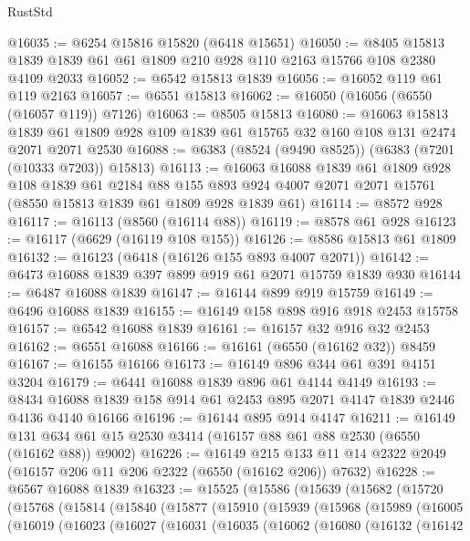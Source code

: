 \begin{lexlean}{RustStd}
\begin{coremodule}
@16035 := @6254 @15816 @15820 (@6418 @15651)
@16050 := @8405 @15813 @1839 @1839 @61 @61 @1809 @210 @928 @110 @2163 @15766 @108 @2380 @4109 @2033
@16052 := @6542 @15813 @1839
@16056 := @16052 @119 @61 @119 @2163
@16057 := @6551 @15813
@16062 := @16050 (@16056 (@6550 (@16057 @119)) @7126)
@16063 := @8505 @15813
@16080 := @16063
    @15813
    @1839
    @61
    @1809
    @928
    @109
    @1839
    @61
    @15765
    @32
    @160
    @108
    @131
    @2474
    @2071
    @2071
    @2530
@16088 := @6383 (@8524 (@9490 @8525)) (@6383 (@7201 (@10333 @7203)) @15813)
@16113 := @16063
    @16088
    @1839
    @61
    @1809
    @928
    @108
    @1839
    @61
    @2184
    @88
    @155
    @893
    @924
    @4007
    @2071
    @2071
    @15761
    (@8550 @15813 @1839 @61 @1809 @928 @1839 @61)
@16114 := @8572 @928
@16117 := @16113 (@8560 (@16114 @88))
@16119 := @8578 @61 @928
@16123 := @16117 (@6629 (@16119 @108 @155))
@16126 := @8586 @15813 @61 @1809
@16132 := @16123 (@6418 (@16126 @155 @893 @4007 @2071))
@16142 := @6473 @16088 @1839 @397 @899 @919 @61 @2071 @15759 @1839 @930
@16144 := @6487 @16088 @1839
@16147 := @16144 @899 @919 @15759
@16149 := @6496 @16088 @1839
@16155 := @16149 @158 @898 @916 @918 @2453 @15758
@16157 := @6542 @16088 @1839
@16161 := @16157 @32 @916 @32 @2453
@16162 := @6551 @16088
@16166 := @16161 (@6550 (@16162 @32)) @8459
@16167 := @16155 @16166
@16173 := @16149 @896 @344 @61 @391 @4151 @3204
@16179 := @6441 @16088 @1839 @896 @61 @4144 @4149
@16193 := @8434 @16088 @1839 @158 @914 @61 @2453 @895 @2071 @4147 @1839 @2446 @4136 @4140 @16166
@16196 := @16144 @895 @914 @4147
@16211 := @16149 @131 @634 @61 @15 @2530 @3414 (@16157 @88 @61 @88 @2530 (@6550 (@16162 @88)) @9002)
@16226 := @16149
    @215
    @133
    @11
    @14
    @2322
    @2049
    (@16157 @206 @11 @206 @2322 (@6550 (@16162 @206)) @7632)
@16228 := @6567 @16088 @1839
@16323 := @15525
    (@15586
      (@15639
        (@15682
          (@15720
            (@15768
              (@15814
                (@15840
                  (@15877
                    (@15910
                      (@15939
                        (@15968
                          (@15989
                            (@16005
                              (@16019
                                (@16023
                                  (@16027
                                    (@16031
                                      (@16035
                                        (@16062
                                          (@16080
                                            (@16132
                                              (@16142

\end{coremodule}
\end{lexlean}
